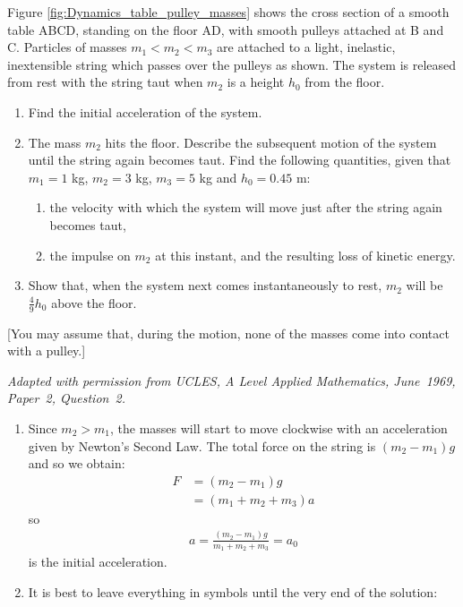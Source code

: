 \begin{problem}[A1969AMIIQ2a]
{Figure \ref{fig:Dynamics_table_pulley_masses} shows the cross section of a smooth table ABCD, standing on the floor AD, with smooth pulleys attached at B and C. Particles of masses $m_{1} < m_{2} < m_{3}$ are attached to a light, inelastic, inextensible string which passes over the pulleys as shown. The system is released from rest with the string taut when $m_{2}$ is a height $h_{0}$ from the floor.
\begin{enumerate}
	\item Find the initial acceleration of the system.
	\item The mass $m_{2}$ hits the floor. Describe the subsequent motion of the system until the string again becomes taut. Find the following quantities, given that $m_{1} = 1$ kg, $m_{2} = 3$ kg, $m_{3} = 5$ kg and $h_{0} = 0.45$ m:
	\begin{enumerate}
		\item the velocity with which the system will move just after the string again becomes taut,
		\item the impulse on $m_{2}$ at this instant, and the resulting loss of kinetic energy.
	\end{enumerate}
	\item Show that, when the system next comes instantaneously to rest, $m_{2}$ will be $\frac{4}{9}h_{0}$ above the floor.
\end{enumerate}
[You may assume that, during the motion, none of the masses come into contact with a pulley.]
}
{\textit{Adapted with permission from UCLES, A Level Applied Mathematics, June~1969, Paper~2, Question~2.}}
{\begin{enumerate}
	\item Since $m_{2} > m_{1}$, the masses will start to move clockwise with an acceleration given by Newton's Second Law. The total force on the string is $(m_{2} - m_{1})g$ and so we obtain:
	\begin{align*} F &= (m_{2} - m_{1})g\\ &= (m_{1} + m_{2} + m_{3})a \end{align*} so \begin{align*} a = \frac{(m_{2} - m_{1})g}{m_{1} + m_{2} + m_{3}} = a_{0} \end{align*}
is the initial acceleration.
	\item It is best to leave everything in symbols until the very end of the solution:
	\begin{enumerate}

\end{enumerate}
\end{enumerate}}
\end{problem}
